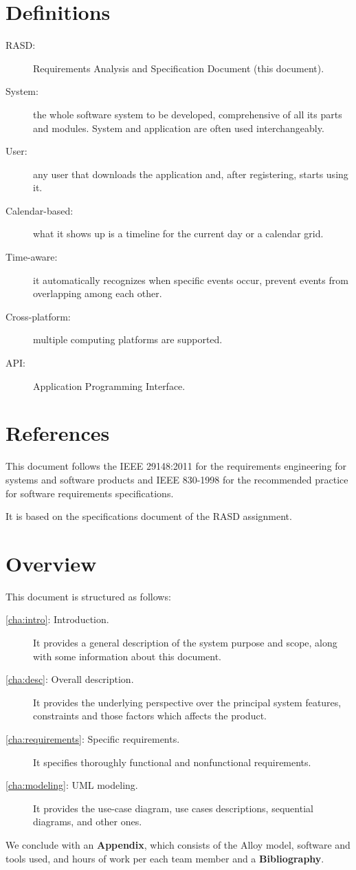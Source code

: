 \section{Definitions}
\label{sec:defs}
\begin{description}
\item[RASD:] Requirements Analysis and Specification Document (this document).
\item[System:] the whole software system to be developed, comprehensive of all its parts and modules. System and application are often used interchangeably. 
\item[User:] any user that downloads the application and, after registering, starts using it.
\item[Calendar-based:] what it shows up is a timeline for the current day or a calendar grid. 
\item[Time-aware:] it automatically recognizes when specific events occur, prevent events from overlapping among each other.
\item[Cross-platform:] multiple computing platforms are supported.
\item[API:] Application Programming Interface.
\end{description}

\section{References}
\label{sec:refer}

This document follows the IEEE 29148:2011\cite{ieee-29148} for the requirements engineering for systems and software products and IEEE 830-1998\cite{ieee-830} for the recommended practice for software requirements specifications.

It is based on the specifications document of the RASD assignment\cite{assignment}.

\section{Overview}
\label{sec:overview}

This document is structured as follows:
\begin{description}
\item[\autoref{cha:intro}: Introduction.] It provides a general description of the system purpose and scope, along with some information about this document.
\item[\autoref{cha:desc}: Overall description.] It provides the underlying perspective over the principal system features, constraints and those factors which affects the product.
\item[\autoref{cha:requirements}: Specific requirements.] It specifies thoroughly functional and nonfunctional requirements.
\item[\autoref{cha:modeling}: UML modeling.] It provides the use-case diagram, use cases descriptions, sequential diagrams, and other ones.
\end{description}
We conclude with an \textbf{Appendix}, which consists of the Alloy model, software and tools used, and hours of work per each team member and a \textbf{Bibliography}.